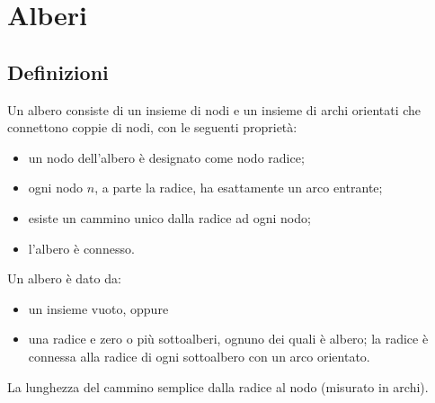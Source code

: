 
\ifsubfile
\pagestyle{plain}
\setcounter{chapter}{4}



\fi
\chapter{Alberi}


\section{Definizioni}

\begin{definition}
Un albero consiste di un insieme di nodi e un insieme di archi orientati che connettono coppie di nodi, con le seguenti proprietà:
\begin{itemize}
	\item un nodo dell'albero è designato come nodo radice;
	\item ogni nodo \(n\), a parte la radice, ha esattamente un arco entrante;
	\item esiste un cammino unico dalla radice ad ogni nodo;
	\item l'albero è connesso.
\end{itemize}
\end{definition}

\begin{definition}
Un albero è dato da:
\begin{itemize}
	\item un insieme vuoto, oppure
	\item una radice e zero o più sottoalberi, ognuno dei quali è albero; la radice è connessa alla radice di ogni sottoalbero con un arco orientato.
\end{itemize}
\end{definition}

\begin{definition}
La lunghezza del cammino semplice dalla radice al nodo (misurato in archi).
\end{definition}

